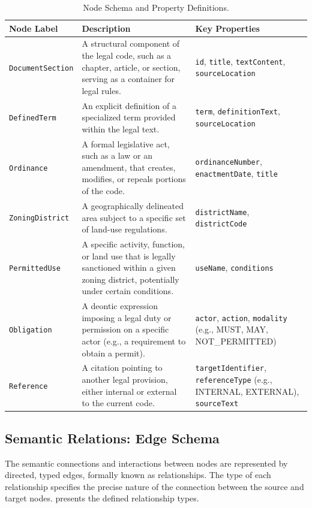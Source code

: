 \begin{table}[htbp]
\centering
{}
\caption{Node Schema and Property Definitions.}
\label{tab:node_schema}
\begin{tabularx}{\textwidth}{@{} >{\raggedright}p{} >{\raggedright}p{} >{\raggedright\arraybackslash}p{} @{}}
\toprule
\textbf{Node Label} & \textbf{Description} & \textbf{Key Properties} \\ 
\midrule
\texttt{DocumentSection} & A structural component of the legal code, such as a chapter, article, or section, serving as a container for legal rules. & \texttt{id}, \texttt{title}, \texttt{textContent}, \texttt{sourceLocation} \\ 
\addlinespace
\texttt{DefinedTerm} & An explicit definition of a specialized term provided within the legal text. & \texttt{term}, \texttt{definitionText}, \texttt{sourceLocation} \\ 
\addlinespace
\texttt{Ordinance} & A formal legislative act, such as a law or an amendment, that creates, modifies, or repeals portions of the code. & \texttt{ordinanceNumber}, \texttt{enactmentDate}, \texttt{title} \\ 
\addlinespace
\texttt{ZoningDistrict} & A geographically delineated area subject to a specific set of land-use regulations. & \texttt{districtName}, \texttt{districtCode} \\ 
\addlinespace
\texttt{PermittedUse} & A specific activity, function, or land use that is legally sanctioned within a given zoning district, potentially under certain conditions. & \texttt{useName}, \texttt{conditions} \\ 
\addlinespace
\texttt{Obligation} & A deontic expression imposing a legal duty or permission on a specific actor (e.g., a requirement to obtain a permit). & \texttt{actor}, \texttt{action}, \texttt{modality} (e.g., MUST, MAY, NOT\_PERMITTED) \\ 
\addlinespace
\texttt{Reference} & A citation pointing to another legal provision, either internal or external to the current code. & \texttt{targetIdentifier}, \texttt{referenceType} (e.g., INTERNAL, EXTERNAL), \texttt{sourceText} \\ 
\bottomrule
\end{tabularx}
\end{table}

\subsection{Semantic Relations: Edge Schema}
The semantic connections and interactions between nodes are represented by directed, typed edges, formally known as relationships. The type of each relationship specifies the precise nature of the connection between the source and target nodes.  presents the defined relationship types.

